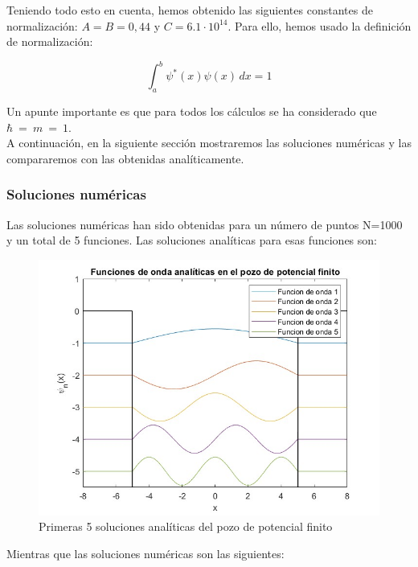 \documentclass[12pt]{article}
\begin{document}
Teniendo todo esto en cuenta, hemos obtenido las siguientes constantes de normalización: $A=B=0,44$ y $C=6.1\cdot 10^{14}$. Para ello, hemos usado la definición de normalización:

\begin{equation}
\int_{a}^{b} \psi^{*}(x) \psi(x) \,dx=1
\end{equation}

Un apunte importante es que para todos los cálculos se ha considerado que $\hbar~=~m~=~1$. \\

A continuación, en la siguiente sección mostraremos las soluciones numéricas y las compararemos con las obtenidas analíticamente.

\subsubsection{Soluciones numéricas}

Las soluciones numéricas han sido obtenidas para un número de puntos N=1000 y un total de 5 funciones. Las soluciones analíticas
para esas funciones son: 

\begin{figure}[H]
    \centering
    \includegraphics[width=1.0\textwidth]{analiticas.jpg}
    \caption{Primeras 5 soluciones analíticas del pozo de potencial finito}
\end{figure}

\newpage
Mientras que las soluciones numéricas son las siguientes:
\end{document}
